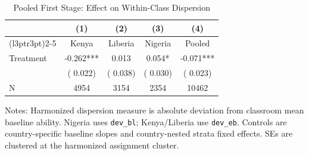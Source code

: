 \begin{table}[!htbp]
\centering
\caption{Pooled First Stage: Effect on Within-Class Dispersion}
\label{tab:pooled_dispersion}
\begin{threeparttable}
\begin{tabular}[t]{lcccc}
\toprule
 & (1) & (2) & (3) & (4) \\
\cmidrule(l{3pt}r{3pt}){2-5}
 & Kenya & Liberia & Nigeria & Pooled \\
\midrule
Treatment &  -0.262*** &   0.013 &   0.054* &  -0.071*** \\
 & (  0.022) & (  0.038) & (  0.030) & (  0.023) \\
\addlinespace
N & 4954 & 3154 & 2354 & 10462 \\
\bottomrule
\end{tabular}
\begin{tablenotes}[para]
\item Notes: Harmonized dispersion measure is absolute deviation from classroom mean baseline ability. 
Nigeria uses \texttt{dev\_bl}; Kenya/Liberia use \texttt{dev\_eb}. Controls are country-specific baseline slopes and country-nested strata fixed effects. SEs are clustered at the harmonized assignment cluster.
\end{tablenotes}
\end{threeparttable}
\end{table}
